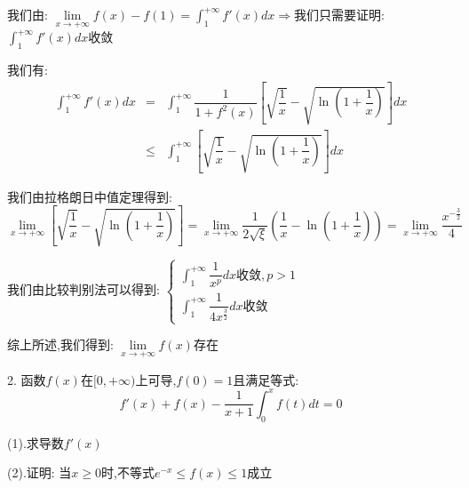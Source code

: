 \begin{solution}

	我们由:  $\lim\limits_{x\rightarrow +\infty}f(x)-f(1)=\int_{1}^{+\infty}f'(x)dx\Rightarrow $我们只需要证明:  $\int_{1}^{+\infty}f'(x)dx$收敛
	
	我们有:  
	\begin{eqnarray*}
		\int_{1}^{+\infty}f'(x)dx&=&\int_{1}^{+\infty}\dfrac{1}{1+f^{2}(x)}\left[\sqrt{\dfrac{1}{x}}-\sqrt{\ln(1+\dfrac{1}{x})} \right]dx\\
		&\leq&\int_{1}^{+\infty}\left[\sqrt{\dfrac{1}{x}}-\sqrt{\ln(1+\dfrac{1}{x})} \right]dx
	\end{eqnarray*}
	
	我们由拉格朗日中值定理得到:  
	$$\lim\limits_{x\rightarrow+\infty}\left[\sqrt{\dfrac{1}{x}}-\sqrt{\ln(1+\dfrac{1}{x})} \right]=\lim\limits_{x\rightarrow+\infty}\dfrac{1}{2\sqrt{\xi}}\left(\dfrac{1}{x}-\ln(1+\dfrac{1}{x}) \right)=\lim\limits_{x\rightarrow+\infty}\dfrac{x^{-\frac{3}{2}}}{4}$$
	
	我们由比较判别法可以得到:  $\left\lbrace 
	\begin{array}{l}
		\int_{1}^{+\infty}\dfrac{1}{x^p}dx\text{收敛},p>1\\
		\int_{1}^{+\infty}\dfrac{1}{4x^{\frac{3}{2}}}dx\text{收敛}
	\end{array}
	\right. $
	
	综上所述,我们得到:  $\lim\limits_{x\rightarrow +\infty}f(x)$存在
\end{solution}

2. 函数$f(x)$在$[0,+\infty)$上可导,$f(0)=1$且满足等式:  
$$f'(x)+f(x)-\dfrac{1}{x+1}\int_{0}^{x}f(t)dt=0$$

(1).求导数$f'(x)$

(2).证明:  当$x\geq 0$时,不等式$e^{-x}\leq f(x)\leq 1$成立

